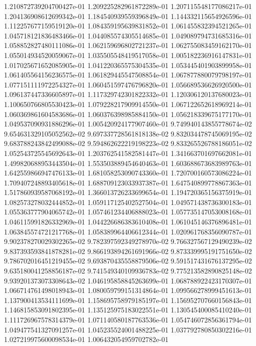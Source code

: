 1.210872739204700427e-01
1.209225282961872289e-01
1.207115548177086217e-01
1.204136908612699342e-01
1.184540939559396849e-01
1.144332115654926596e-01
1.112257677159519120e-01
1.084359195639831852e-01
1.061455832394521265e-01
1.045718121836483466e-01
1.044085574305514685e-01
1.049089794731685316e-01
1.058852827480111086e-01
1.062159696802721237e-01
1.062755083459162170e-01
1.055014934520059067e-01
1.035505548419517058e-01
1.005182236916147831e-01
1.017025671652085905e-01
1.041220365575304535e-01
1.053445401903899958e-01
1.061405564156236575e-01
1.061829445547508854e-01
1.067877880079798197e-01
1.077151111972254327e-01
1.060451597476796820e-01
1.056689536626920500e-01
1.096137447336605897e-01
1.117329742301822332e-01
1.120306120137680023e-01
1.100650766805530423e-01
1.079228217909914550e-01
1.067122652618969214e-01
1.060369861604583686e-01
1.060376398985884150e-01
1.056218339675177170e-01
1.049537090931886296e-01
1.005420924177907460e-01
9.749940143855778674e-02
9.654631329105052562e-02
9.697337728561818138e-02
9.832034478745069195e-02
9.683788243842499088e-02
9.594862622219198223e-02
9.833265526788186051e-02
1.052543725545692643e-01
1.203762541582581447e-01
1.341663701697662081e-01
1.499820688953443504e-01
1.553503889454640463e-01
1.603688673683989763e-01
1.642559866947476133e-01
1.681058253090743360e-01
1.720700160573086224e-01
1.709407248893405618e-01
1.688709123033937387e-01
1.647540899778867363e-01
1.517860939587068192e-01
1.366013726233699654e-01
1.194720365156375919e-01
1.082573278032444852e-01
1.059117125402527504e-01
1.049571438736300183e-01
1.055363777904065742e-01
1.057461234406888023e-01
1.057735147053008168e-01
1.046115991826332969e-01
1.044226686383610408e-01
1.061045146376896481e-01
1.063845574721217768e-01
1.058389964406612344e-01
1.020961768356090787e-01
9.902378270029302265e-02
9.782397592349278970e-02
9.766327567129490239e-02
9.837393593841878281e-02
9.866193894261691966e-02
9.873339995191751650e-02
9.786702016451219455e-02
9.693870435558879506e-02
9.591517431676137295e-02
9.635180041258856187e-02
9.741549340109936783e-02
9.775213582890825148e-02
9.939201373073308643e-02
1.046195858845263699e-01
1.068788922423170307e-01
1.066714761498018943e-01
1.080059799151314864e-01
1.099566278999451613e-01
1.137900413534111699e-01
1.158695758979185197e-01
1.156952707660156843e-01
1.146815853091802395e-01
1.135125975183022551e-01
1.130545400085410240e-01
1.111726967578314379e-01
1.071140580187763536e-01
1.054746072856361794e-01
1.049477541327091257e-01
1.045235524001488225e-01
1.037792780850302216e-01
1.027219975600098534e-01
1.006432054959702782e-01

